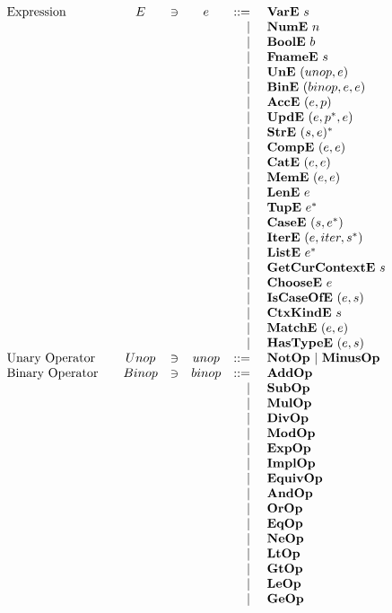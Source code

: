 \newpage
\begin{align*}
\begin{array}{lcccrlr}
%
  \text{Expression}\quad& E &\ni& e &::=& ~ \vare ~ s \\
    &&&& | & ~ \nume ~ n \\
    &&&& | & ~ \boole ~ b \\
    &&&& | & ~ \fnamee ~ s \\
    &&&& | & ~ \une ~ (unop, e) \\
    &&&& | & ~ \bine ~ (binop, e, e) \\
    &&&& | & ~ \acce ~ (e, p) \\
    &&&& | & ~ \upde ~ (e, \seq{p}, e) \\
    &&&& | & ~ \stre ~ \seq{(s, e)} \\
    &&&& | & ~ \compe ~ (e, e) \\
    &&&& | & ~ \cate ~ (e, e) \\
    &&&& | & ~ \meme ~ (e, e) \\
    &&&& | & ~ \lene ~ e \\
    &&&& | & ~ \tupe ~ \seq e \\
    &&&& | & ~ \casee ~ (s, \seq e) \\
    &&&& | & ~ \itere ~ (e, iter, \seq{s}) \\
    &&&& | & ~ \liste ~ \seq e \\
    &&&& | & ~ \getcurctxe ~ s \\
    &&&& | & ~ \choosee ~ e \\
    &&&& | & ~ \iscaseofe ~ (e, s) \\
    &&&& | & ~ \ctxkinde ~ s \\
    &&&& | & ~ \matche ~ (e, e) \\
    &&&& | & ~ \hastypee ~ (e, s) \\
%
  \text{Unary Operator}\quad& Unop &\ni& unop &::=& ~ \notop ~ | ~ \minusop \\
  \text{Binary Operator}\quad& Binop &\ni& binop &::=& ~ \addop \\
    &&&& | & ~ \subop \\
    &&&& | & ~ \mulop \\
    &&&& | & ~ \divop \\
    &&&& | & ~ \modop \\
    &&&& | & ~ \expop \\
    &&&& | & ~ \implop \\
    &&&& | & ~ \equivop \\
    &&&& | & ~ \andop \\
    &&&& | & ~ \orop \\
    &&&& | & ~ \eqop \\
    &&&& | & ~ \neop \\
    &&&& | & ~ \ltop \\
    &&&& | & ~ \gtop \\
    &&&& | & ~ \leop \\
    &&&& | & ~ \geop \\
\end{array}
\end{align*}
